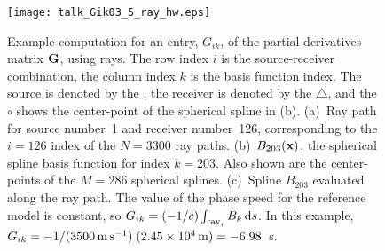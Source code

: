 \documentclass[11pt,titlepage,fleqn]{article}
\begin{document}
\begin{figure}[p]
\hspace{-1.5cm}
\texttt{[image: talk\_Gik03\_5\_ray\_hw.eps]}
\caption[Basis function]
{{
Example computation for an entry, $G_{ik}$, of the partial derivatives matrix $\mbox{${\bf G}$}$, using rays. The row index $i$ is the source-receiver combination, the column index $k$ is the basis function index. The source is denoted by the , the receiver is denoted by the $\triangle$, and the $\circ$ shows the center-point of the spherical spline in (b).
(a)~Ray path for source number~1 and receiver number~126, corresponding to the $i=126$ index of the $N=3300$ ray paths.
(b)~$B_{203}(\mbox{${\bf x}$})$, the spherical spline basis function for index $k=203$. Also shown are the center-points of the $M=286$ spherical splines.
(c)~Spline $B_{203}$ evaluated along the ray path. The value of the phase speed for the reference model is constant, so $G_{ik} = (-1/c) \int_{{\rm ray}_i} B_k\,\mathrm{d} s$. In this example, $G_{ik} = -1/(3500\,{\rm m\,s^{-1}})\;(2.45 \times 10^4\,{\rm m})  = -6.98$~s. 
\label{fig:basis}
}}
\end{figure}

\end{document}
